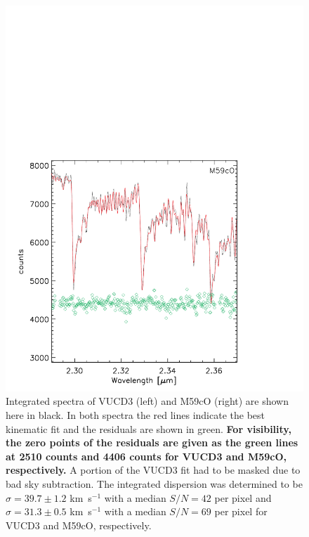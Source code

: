 \documentclass{aastex}
\begin{document}
\begin{figure}[ht!]
\begin{minipage}{0.48\textwidth}
    \includegraphics[trim={0 0 0 10cm},clip,scale=0.5]{m59co_intfit.pdf}%
  \end{minipage}
  \caption{Integrated spectra of VUCD3 (left) and M59cO (right) are shown here in black. In both spectra the red lines indicate the best kinematic fit and the residuals are shown in green. \textbf{For visibility, the zero points of the residuals are given as the green lines at 2510 counts and 4406 counts for VUCD3 and M59cO, respectively.} A portion of the VUCD3 fit had to be masked due to bad sky subtraction. The integrated dispersion was determined to be $\sigma = 39.7 \pm 1.2$ km~s$^{-1}$ with a median $S/N = 42$ per pixel and $\sigma = 31.3 \pm 0.5$ km~s$^{-1}$ with a median $S/N = 69$ per pixel for VUCD3 and M59cO, respectively.}
  
  \label{fig:kinematics}
\end{figure}
\end{document}
